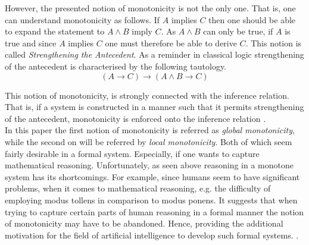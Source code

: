\documentclass{article}
\begin{document}
However, the presented notion of monotonicity is not the only one. That is, one can understand monotonicity as follows. If $A$ implies $C$ then one should be able to expand the statement to $A \wedge B$ imply $C$. As $A \wedge B$ can only be true, if $A$ is true and since $A$ implies $C$ one must therefore be able to derive $C$.
This notion is called \emph{Strengthening the Antecedent}. As a reminder 
in classical logic strengthening of the antecedent is characterised by the following tautology.
\begin{equation*}
(A \to C) \to (A \wedge B \to C)
\end{equation*}
\begin{comment}
\begin{prooftree}
\AxiomC{$[A \wedge B]$}
\RightLabel{\scriptsize($\wedge e$)}
\UnaryInfC{$A$}
\AxiomC{$[A\to C]$}
\RightLabel{\scriptsize($\to e$)}
\BinaryInfC{$C$}
\RightLabel{\scriptsize($\to i$)}
\UnaryInfC{$A \wedge B \to C$}
\RightLabel{\scriptsize($\to i$)}
\UnaryInfC{$(A \to C) \to (A \wedge B \to C)$}
\end{prooftree}
\end{comment}
This notion of monotonicity, is strongly connected with the inference relation. That is, if a system is constructed in a manner such that it permits strengthening of the antecedent, monotonicity is enforced onto the inference relation
\cite{bochman2005explanatory}. 
\\
In this paper the first notion of monotonicity is referred as \emph{global monotonicity}, while the second on will be referred by \emph{local monotonicity}. Both of which seem fairly desirable in a formal system. Especially, if one wants to capture mathematical reasoning. Unfortunately, as seen above reasoning in a monotone system has its shortcomings. For example, since humans seem to have significant problems, when it comes to mathematical reasoning, e.g. the difficulty of employing modus tollens in comparison to modus ponens. It suggests that when trying to capture certain parts of human reasoning in a formal manner the notion of monotonicity may have to be abandoned. Hence, providing the additional motivation for the field of artificial intelligence to develop such formal systems.
\cite{evans2002logic, BOCHMAN2007557}. \\
\end{document}
